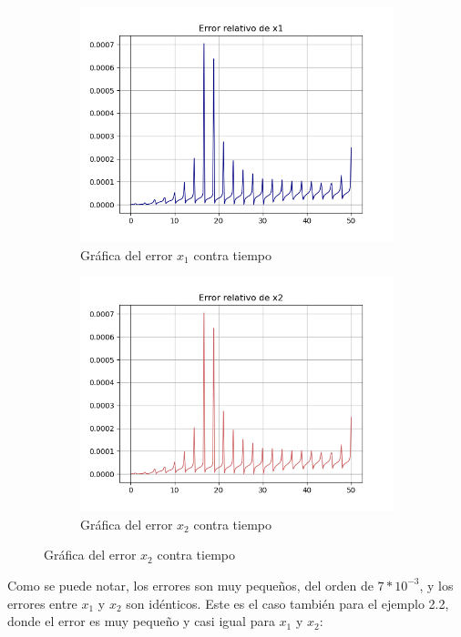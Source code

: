 \documentclass[12pt]{article}
\begin{document}
\begin{figure}[h!]
\begin{subfigure}{.6\textwidth}
  \centering
  \includegraphics[width=.8\linewidth]{Ej2_14.png}
  \caption{Gráfica del error $x_1$ contra tiempo}
  \label{fig:sfig2}
\end{subfigure}
\begin{subfigure}{.6\textwidth}
  \centering
  \includegraphics[width=.8\linewidth]{Ej2_15.png}
  \caption{Gráfica del error $x_2$ contra tiempo}
  \label{fig:sfig2}
\end{subfigure}
\end{figure}

Como se puede notar, los errores son muy pequeños, del orden de $7*10^{-3}$, y los errores entre $x_1$ y $x_2$ son idénticos. Este es el caso también para el ejemplo 2.2, donde el error es muy pequeño y casi igual para $x_1$ y $x_2$:
\end{document}
